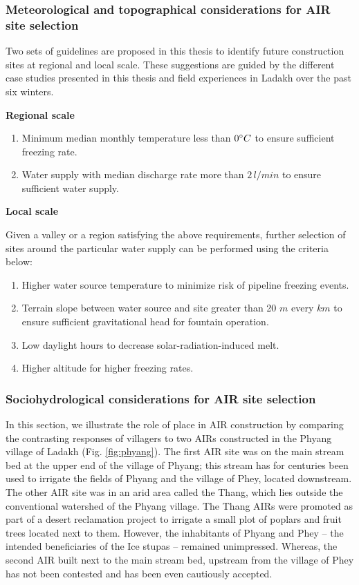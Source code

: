 \subsubsection{Meteorological and topographical considerations for AIR site selection}

Two sets of guidelines are proposed in this thesis to identify future construction sites at regional and local
scale. These suggestions are guided by the different case studies presented in this thesis and field experiences
in Ladakh over the past six winters.

\textbf{Regional scale}

\begin{enumerate}

	\item Minimum median monthly temperature less than $0 ^{\circ} C$ to ensure sufficient freezing rate.
	\item Water supply with median discharge rate more than $2\, l/min$ to ensure sufficient water supply.

\end{enumerate}

\textbf{Local scale}

Given a valley or a region satisfying the above requirements, further selection of sites around the particular
water supply can be performed using the criteria below:

\begin{enumerate}
	\item Higher water source temperature to minimize risk of pipeline freezing events.
	\item Terrain slope between water source and site greater than 20 $m$ every $km$ to ensure sufficient
    gravitational head for fountain operation.
	\item Low daylight hours to decrease solar-radiation-induced melt.
	\item Higher altitude for higher freezing rates.
\end{enumerate}

\subsubsection{Sociohydrological considerations for AIR site selection}

In this section, we illustrate the role of place in AIR construction by comparing the
contrasting responses of villagers to two AIRs constructed in the Phyang village of Ladakh (Fig. \ref{fig:phyang}). The first AIR site was on the main stream bed at the 
upper end of the village of Phyang; this stream has for centuries been used to irrigate the fields of Phyang and 
the village of Phey, located downstream. The other AIR site was in an arid area called the Thang, which lies 
outside the conventional watershed of the Phyang village. The Thang AIRs were
promoted as part of a desert reclamation project to irrigate a small plot of poplars and fruit trees located next
to them. However, the inhabitants of Phyang and Phey – the intended beneficiaries of the Ice stupas – remained unimpressed.
Whereas, the second AIR built next to the main stream bed, 
upstream from the village of Phey has not been contested and has been even cautiously accepted.

